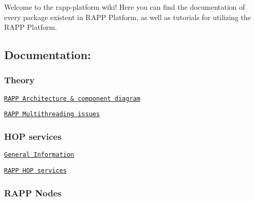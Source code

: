 Welcome to the rapp-\/platform wiki! Here you can find the documentation of every package existent in R\-A\-P\-P Platform, as well as tutorials for utilizing the R\-A\-P\-P Platform.

\subsection*{Documentation\-:}

\subsubsection*{Theory}


\begin{DoxyItemize}
\item \href{https://github.com/rapp-project/rapp-platform/wiki/RAPP-Architecture}{\tt R\-A\-P\-P Architecture \& component diagram}
\item \href{https://github.com/rapp-project/rapp-platform/wiki/RAPP-Multithreading-issues}{\tt R\-A\-P\-P Multithreading issues}
\end{DoxyItemize}

\subsubsection*{H\-O\-P services}


\begin{DoxyItemize}
\item \href{https://github.com/rapp-project/rapp-platform/wiki/HOP-Services---General-Information}{\tt General Information}
\item \href{https://github.com/rapp-project/rapp-platform/wiki/RAPP-HOP-services}{\tt R\-A\-P\-P H\-O\-P services}
\end{DoxyItemize}

\subsubsection*{R\-A\-P\-P Nodes}


